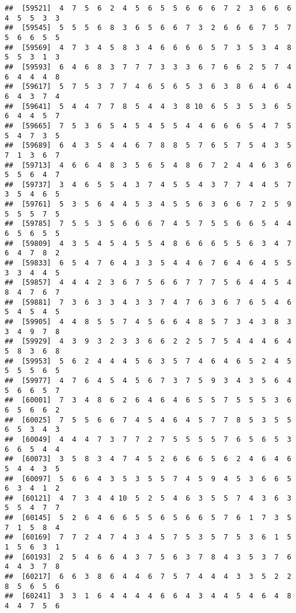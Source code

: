 \documentclass[
]{book}
\begin{document}
\begin{verbatim}
##  [59521]  4  7  5  6  2  4  5  6  5  5  6  6  6  7  2  3  6  6  6  4  5  5  3  3
##  [59545]  5  5  5  6  8  3  6  5  6  6  7  3  2  6  6  6  7  5  7  5  6  6  5  5
##  [59569]  4  7  3  4  5  8  3  4  6  6  6  6  5  7  3  5  3  4  8  5  5  3  1  3
##  [59593]  6  4  6  8  3  7  7  7  3  3  3  6  7  6  6  2  5  7  4  6  4  4  4  8
##  [59617]  5  7  5  3  7  7  4  6  5  6  5  3  6  3  8  6  4  6  4  6  4  3  7  4
##  [59641]  5  4  4  7  7  8  5  4  4  3  8 10  6  5  3  5  3  6  5  6  4  4  5  7
##  [59665]  7  5  3  6  5  4  5  4  5  5  4  4  6  6  6  5  4  7  5  5  4  7  3  5
##  [59689]  6  4  3  5  4  4  6  7  8  8  5  7  6  5  7  5  4  3  5  7  1  3  6  7
##  [59713]  4  6  6  4  8  3  5  6  5  4  8  6  7  2  4  4  6  3  6  5  5  6  4  7
##  [59737]  3  4  6  5  5  4  3  7  4  5  5  4  3  7  7  4  4  5  7  3  5  4  6  5
##  [59761]  5  3  5  6  4  4  5  3  4  5  5  6  3  6  6  7  2  5  9  5  5  5  7  5
##  [59785]  7  5  5  3  5  6  6  6  7  4  5  7  5  5  6  6  5  4  4  6  5  6  5  5
##  [59809]  4  3  5  4  5  4  5  5  4  8  6  6  6  5  5  6  3  4  7  6  4  7  8  2
##  [59833]  6  5  4  7  6  4  3  3  5  4  4  6  7  6  4  6  4  5  5  3  3  4  4  5
##  [59857]  4  4  4  2  3  6  7  5  6  6  7  7  7  5  6  4  4  5  4  8  4  7  6  7
##  [59881]  7  3  6  3  3  4  3  3  7  4  7  6  3  6  7  6  5  4  6  5  4  5  4  5
##  [59905]  4  4  8  5  5  7  4  5  6  6  4  8  5  7  3  4  3  8  3  3  4  9  7  8
##  [59929]  4  3  9  3  2  3  3  6  6  2  2  5  7  5  4  4  4  6  4  5  8  3  6  8
##  [59953]  5  6  2  4  4  4  5  6  3  5  7  4  6  4  6  5  2  4  5  5  5  5  6  5
##  [59977]  4  7  6  4  5  4  5  6  7  3  7  5  9  3  4  3  5  6  4  5  6  6  5  7
##  [60001]  7  3  4  8  6  2  6  4  6  4  6  5  5  7  5  5  5  3  6  6  5  6  6  2
##  [60025]  7  5  5  6  6  7  4  5  4  6  4  5  7  7  8  5  3  5  5  6  5  3  4  3
##  [60049]  4  4  4  7  3  7  7  2  7  5  5  5  5  7  6  5  6  5  3  6  6  5  4  4
##  [60073]  3  5  8  3  4  7  4  5  2  6  6  6  5  6  2  4  6  4  6  5  4  4  3  5
##  [60097]  5  6  6  4  3  5  3  5  5  7  4  5  9  4  5  3  6  6  5  6  3  4  1  2
##  [60121]  4  7  3  4  4 10  5  2  5  4  6  3  5  5  7  4  3  6  3  5  5  4  7  7
##  [60145]  5  2  6  4  6  6  5  5  6  5  6  6  5  7  6  1  7  3  5  7  1  5  8  4
##  [60169]  7  7  2  4  7  4  3  4  5  7  5  3  5  7  5  3  6  1  5  1  5  6  3  1
##  [60193]  2  5  4  6  6  4  3  7  5  6  3  7  8  4  3  5  3  7  6  4  4  3  7  8
##  [60217]  6  6  3  8  6  4  4  6  7  5  7  4  4  4  3  3  5  2  2  8  5  6  5  6
##  [60241]  3  3  1  6  4  4  4  4  6  6  4  3  4  4  5  4  6  4  8  4  4  7  5  6

\end{verbatim}
\end{document}

